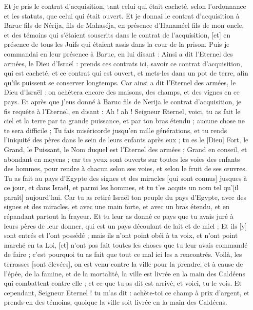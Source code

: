 \begin{multicols}{2}
Et je pris le contrat d'acquisition, tant celui qui était cacheté, selon l'ordonnance et les statuts, que celui qui était ouvert.
Et je donnai le contrat d'acquisition à Baruc fils de Nérija, fils de Mahaséja, en présence d'Hanaméel fils de mon oncle, et des témoins qui s'étaient souscrits dans le contrat de l'acquisition, [et] en présence de tous les Juifs qui étaient assis dans la cour de la prison.
Puis je commandai en leur présence à Baruc, en lui disant :
Ainsi a dit l'Eternel des armées, le Dieu d'Israël : prends ces contrats ici, savoir ce contrat d'acquisition, qui est cacheté, et ce contrat qui est ouvert, et mets-les dans un pot de terre, afin qu'ils puissent se conserver longtemps.
Car ainsi a dit l'Eternel des armées, le Dieu d'Israël : on achètera encore des maisons, des champs, et des vignes en ce pays.
Et après que j'eus donné à Baruc fils de Nerija le contrat d'acquisition, je fis requête à l'Eternel, en disant :
Ah ! ah ! Seigneur Eternel, voici, tu as fait le ciel et la terre par ta grande puissance, et par ton bras étendu ; aucune chose ne te sera difficile ;
Tu fais miséricorde jusqu'en mille générations, et tu rends l'iniquité des pères dans le sein de leurs enfants après eux ; tu es le [Dieu] Fort, le Grand, le Puissant, le Nom duquel est l'Eternel des armées ;
Grand en conseil, et abondant en moyens ; car tes yeux sont ouverts sur toutes les voies des enfants des hommes, pour rendre à chacun selon ses voies, et selon le fruit de ses œuvres.
Tu as fait au pays d'Egypte des signes et des miracles [qui sont connus] jusques à ce jour, et dans Israël, et parmi les hommes, et tu t'es acquis un nom tel qu'[il paraît] aujourd'hui.
Car tu as retiré Israël ton peuple du pays d'Egypte, avec des signes et des miracles, et avec une main forte, et avec un bras étendu, et en répandant partout la frayeur.
Et tu leur as donné ce pays que tu avais juré à leurs pères de leur donner, qui est un pays découlant de lait et de miel ;
Et ils [y] sont entrés et l'ont possédé ; mais ils n'ont point obéi à ta voix, et n'ont point marché en ta Loi, [et] n'ont pas fait toutes les choses que tu leur avais commandé de faire ; c'est pourquoi tu as fait que tout ce mal ici les a rencontrés.
Voilà, les terrasses [sont élevées], on est venu contre la ville pour la prendre, et à cause de l'épée, de la famine, et de la mortalité, la ville est livrée en la main des Caldéens qui combattent contre elle ; et ce que tu as dit est arrivé, et voici, tu le vois.
Et cependant, Seigneur Eternel ! tu m'as dit : achète-toi ce champ à prix d'argent, et prends-en des témoins, quoique la ville soit livrée en la main des Caldéens.

\end{multicols}
